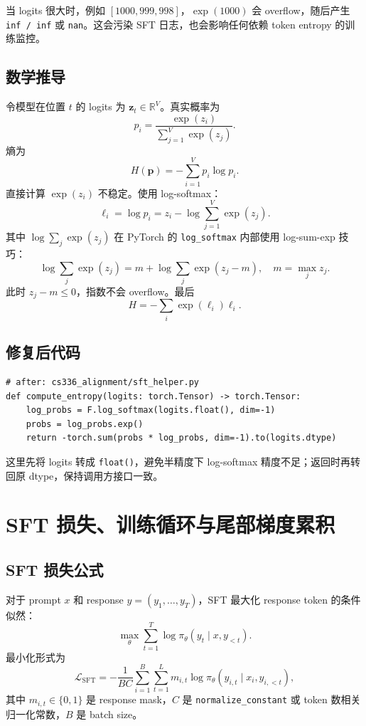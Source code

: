 \documentclass[UTF8,a4paper,11pt]{ctexart}
\begin{document}
当 logits 很大时，例如 $[1000,999,998]$，$\exp(1000)$ 会 overflow，随后产生 \texttt{inf / inf} 或 \texttt{nan}。这会污染 SFT 日志，也会影响任何依赖 token entropy 的训练监控。

\subsection{数学推导}

令模型在位置 $t$ 的 logits 为 $\mathbf{z}_t \in \mathbb{R}^{V}$。真实概率为
\[
  p_i = \frac{\exp(z_i)}{\sum_{j=1}^{V}\exp(z_j)}.
\]
熵为
\[
  H(\mathbf{p}) = -\sum_{i=1}^{V} p_i \log p_i.
\]
直接计算 $\exp(z_i)$ 不稳定。使用 log-softmax：
\[
  \ell_i = \log p_i = z_i - \log\sum_{j=1}^{V}\exp(z_j).
\]
其中 $\log\sum_j \exp(z_j)$ 在 PyTorch 的 \texttt{log\_softmax} 内部使用 log-sum-exp 技巧：
\[
  \log\sum_j \exp(z_j)
  = m + \log\sum_j \exp(z_j-m),
  \quad m=\max_j z_j.
\]
此时 $z_j-m \le 0$，指数不会 overflow。最后
\[
  H = -\sum_i \exp(\ell_i)\ell_i.
\]

\subsection{修复后代码}

\begin{lstlisting}
# after: cs336_alignment/sft_helper.py
def compute_entropy(logits: torch.Tensor) -> torch.Tensor:
    log_probs = F.log_softmax(logits.float(), dim=-1)
    probs = log_probs.exp()
    return -torch.sum(probs * log_probs, dim=-1).to(logits.dtype)
\end{lstlisting}

这里先将 logits 转成 \texttt{float()}，避免半精度下 log-softmax 精度不足；返回时再转回原 dtype，保持调用方接口一致。

\section{SFT 损失、训练循环与尾部梯度累积}

\subsection{SFT 损失公式}

对于 prompt $x$ 和 response $y=(y_1,\dots,y_T)$，SFT 最大化 response token 的条件似然：
\[
  \max_\theta \sum_{t=1}^{T}\log \pi_\theta(y_t \mid x,y_{<t}).
\]
最小化形式为
\[
  \mathcal{L}_{\mathrm{SFT}}
  =
  -\frac{1}{B C}
  \sum_{i=1}^{B}\sum_{t=1}^{L}
  m_{i,t}\log\pi_\theta(y_{i,t}\mid x_i,y_{i,<t}),
\]
其中 $m_{i,t}\in\{0,1\}$ 是 response mask，$C$ 是 \texttt{normalize\_constant} 或 token 数相关归一化常数，$B$ 是 batch size。
\end{document}
